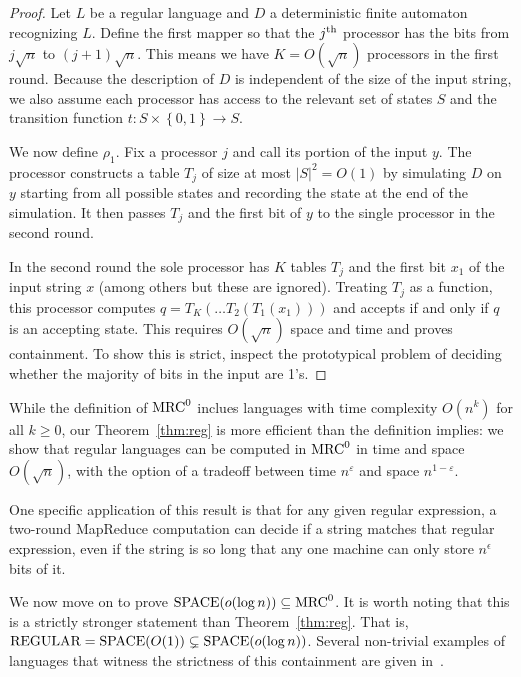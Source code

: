 \begin{proof}
Let $L$ be a regular language and $D$ a deterministic finite automaton
recognizing $L$. Define the first mapper so
that the $j^\textup{th}$ processor has the bits from $j\sqrt{n}$ to
$(j+1)\sqrt{n}$. This means we have $K = O(\sqrt{n})$ processors in the first
round. Because the description of $D$ is independent of the size of the input
string, we also assume each processor has access to the relevant set of states
$S$ and the transition function $t: S \times \left \{ 0,1 \right \} \to S$.

We now define $\rho_1$. Fix a processor $j$ and call its portion of the input
$y$. The processor constructs a table $T_j$ of size at most $|S|^2 = O(1)$ by
simulating $D$ on $y$ starting from all possible states and recording the state
at the end of the simulation. It then passes $T_j$ and the first bit of $y$ to
the single processor in the second round.

In the second round the sole processor has $K$ tables $T_j$ and the first bit
$x_1$ of the input string $x$ (among others but these are ignored). Treating
$T_j$ as a function, this processor computes $q = T_K(\dots T_2(T_1(x_1)))$ and
accepts if and only if $q$ is an accepting state. This requires $O(\sqrt{n})$
space and time and proves containment. To show this is strict, inspect the
prototypical problem of deciding whether the majority of bits in the input are
1's.
\end{proof}

\begin{remark} \label{rmk:tradeoff}
While the definition of $\textup{MRC}^0$ inclues languages with time complexity
$O(n^k)$ for all $k \geq 0$, our Theorem~\ref{thm:reg} is more efficient than
the definition implies: we show that regular languages can be computed in
$\textup{MRC}^0$ in time and space $O(\sqrt{n})$, with the option of a tradeoff between
time $n^\varepsilon$ and space $n^{1-\varepsilon}$.  
\end{remark}

One specific application of this result is that for any given regular
expression, a two-round MapReduce computation can decide if a string matches
that regular expression, even if the string is so long that any one machine can
only store $n^\epsilon$ bits of it.

We now move on to prove $\textup{SPACE}(o(\log n))\subseteq \textup{MRC}^0$. It is worth noting
that this is a strictly stronger statement than Theorem~\ref{thm:reg}. That
is, $\textup{REGULAR}=\textup{SPACE}(O(1))\subsetneq \textup{SPACE}(o(\log n))$. Several
non-trivial examples of languages that witness the strictness of this
containment are given in~\cite{szepietowski1994turing}.

